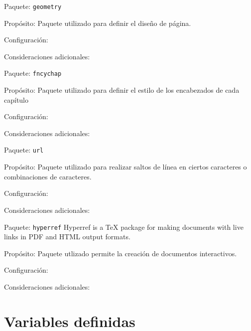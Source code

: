 \begin{Cdescription}%
	\item[Paquete:] {\tt geometry}
	\item[Propósito:] Paquete utilizado para definir el diseño de página.%
	\item[Configuración:]
	\item[Consideraciones adicionales:]
\end{Cdescription}

\begin{Cdescription}
	\item[Paquete:] {\tt fncychap}%
	\item[Propósito:] Paquete utilizado para definir el estilo  de los encabezados de cada capítulo
	\item[Configuración:]
	\item[Consideraciones adicionales:] %
\end{Cdescription}

\begin{Cdescription}%
	\item[Paquete:] {\tt url}
	\item[Propósito:] Paquete utilizado para realizar saltos de línea en ciertos caracteres o combinaciones de caracteres.
	\item[Configuración:]
	\item[Consideraciones adicionales:] %
\end{Cdescription}

\begin{Cdescription}%
	\item[Paquete:] {\tt hyperref} Hyperref is a TeX package for making documents with live links in PDF and HTML output formats. 
	\item[Propósito:] Paquete utlizado permite la creación de documentos interactivos.
	\item[Configuración:]
	\item[Consideraciones adicionales:]
\end{Cdescription}

\section{Variables definidas}

